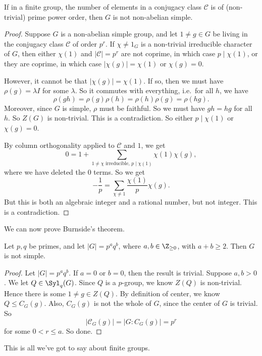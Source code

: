 \documentclass[a4paper]{article}
\begin{document}
\begin{prop}
  If in a finite group, the number of elements in a conjugacy class $\mathcal{C}$ is of (non-trivial) prime power order, then $G$ is not non-abelian simple.
\end{prop}

\begin{proof}
  Suppose $G$ is a non-abelian simple group, and let $1 \not= g \in G$ be living in the conjugacy class $\mathcal{C}$ of order $p^r$. If $\chi \not= 1_G$ is a non-trivial irreducible character of $G$, then either $\chi(1)$ and $|\mathcal{C}| = p^r$ are not coprime, in which case $p \mid \chi(1)$, or they are coprime, in which case $|\chi(g)| = \chi(1)$ or $\chi(g) = 0$.

  However, it cannot be that $|\chi(g)| = \chi(1)$. If so, then we must have $\rho(g) = \lambda I$ for some $\lambda$. So it commutes with everything, i.e.\ for all $h$, we have
  \[
    \rho(gh) = \rho(g)\rho(h) = \rho(h)\rho(g) = \rho(hg).
  \]
  Moreover, since $G$ is simple, $\rho$ must be faithful. So we must have $gh = hg$ for all $h$. So $Z(G)$ is non-trivial. This is a contradiction. So either $p \mid \chi(1)$ or $\chi(g) = 0$.

  By column orthogonality applied to $\mathcal{C}$ and $1$, we get
  \[
    0 = 1 + \sum_{1 \not= \chi\text{ irreducible, } p \mid \chi(1)} \chi(1) \chi(g),
  \]
  where we have deleted the $0$ terms. So we get
  \[
    -\frac{1}{p} = \sum_{\chi \not= 1} \frac{\chi(1)}{p} \chi(g).
  \]
  But this is both an algebraic integer and a rational number, but not integer. This is a contradiction.
\end{proof}

We can now prove Burnside's theorem.
\begin{thm}
  Let $p, q$ be primes, and let $|G| = p^a q^b$, where $a, b \in \Z_{\geq 0}$, with $a + b \geq 2$. Then $G$ is not simple.
\end{thm}

\begin{proof}
  Let $|G| = p^a q^b$. If $a = 0$ or $b = 0$, then the result is trivial. Suppose $a, b > 0$. We let $Q \in \Syl_q(G)$. Since $Q$ is a $p$-group, we know $Z(Q)$ is non-trivial. Hence there is some $1 \not= g \in Z(Q)$. By definition of center, we know $Q \leq C_G(g)$. Also, $C_G(g)$ is not the whole of $G$, since the center of $G$ is trivial. So
  \[
    |\mathcal{C}_G(g)| = |G: C_G(g)| = p^r
  \]
  for some $0 < r \leq a$. So done.
\end{proof}
This is all we've got to say about finite groups.
\end{document}
